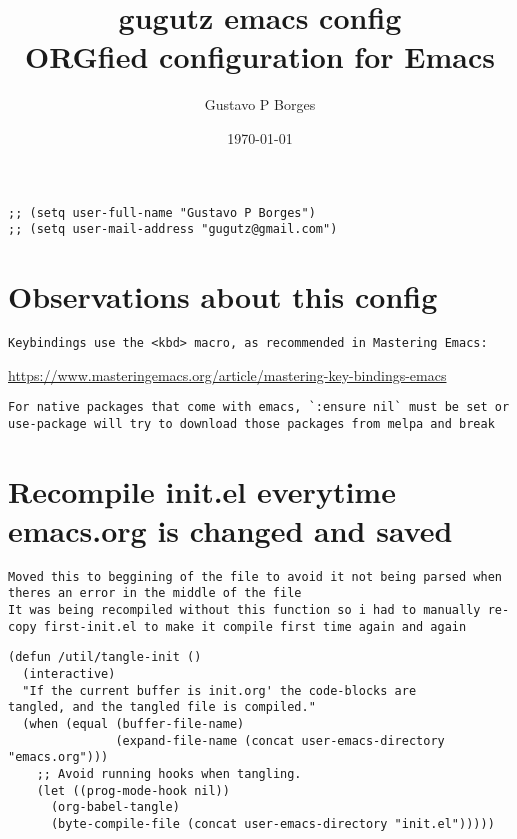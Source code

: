 \documentclass[11pt]{article}
\author{Gustavo P Borges}
\date{\today}
\title{gugutz emacs config\\\medskip
\large ORGfied configuration for Emacs}
\begin{document}
\maketitle
\setcounter{tocdepth}{0}
\tableofcontents

\begin{verbatim}
;; (setq user-full-name "Gustavo P Borges")
;; (setq user-mail-address "gugutz@gmail.com")
\end{verbatim}
\section*{Observations about this config}
\label{sec:org2550b35}
\begin{verbatim}
Keybindings use the <kbd> macro, as recommended in Mastering Emacs:
\end{verbatim}

\url{https://www.masteringemacs.org/article/mastering-key-bindings-emacs}

\begin{verbatim}
For native packages that come with emacs, `:ensure nil` must be set or use-package will try to download those packages from melpa and break
\end{verbatim}

\section*{Recompile init.el everytime emacs.org is changed and saved}
\label{sec:org722fef5}

\begin{verbatim}
Moved this to beggining of the file to avoid it not being parsed when theres an error in the middle of the file
It was being recompiled without this function so i had to manually re-copy first-init.el to make it compile first time again and again
\end{verbatim}



\begin{verbatim}
(defun /util/tangle-init ()
  (interactive)
  "If the current buffer is init.org' the code-blocks are
tangled, and the tangled file is compiled."
  (when (equal (buffer-file-name)
               (expand-file-name (concat user-emacs-directory "emacs.org")))
    ;; Avoid running hooks when tangling.
    (let ((prog-mode-hook nil))
      (org-babel-tangle)
      (byte-compile-file (concat user-emacs-directory "init.el")))))
\end{verbatim}
\end{document}
